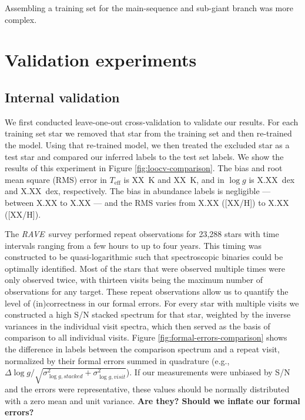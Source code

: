 \documentclass[preprint,trackchanges]{aastex}
\newcommand{\project}[1]{\textsl{#1}}
\newcommand{\rave}{\project{\acronym{RAVE}}}
\newcommand{\acronym}[1]{{\small{#1}}}
\newcommand{\stub}[1]{\textbf{#1}}
\newcommand{\teff}{T_{\mathrm{eff}}}
\newcommand{\logg}{\log g}
\begin{document}
Assembling a training set for the main-sequence and sub-giant branch was more complex.






\section{Validation experiments}
\label{sec:validation}


\subsection{Internal validation}
We first conducted leave-one-out cross-validation to validate our results.
For each training set star we removed that star from the training set and
then re-trained the model.  Using that re-trained model, we then treated
the excluded star as a test star and compared our inferred labels to the
test set labels.  We show the results of this experiment in Figure
\ref{fig:loocv-comparison}.  The bias and root mean square (RMS) error in 
$\teff$ is XX~K and XX~K, and in $\logg$ is X.XX~dex and X.XX~dex,
respectively.  The bias in abundance labels is negligible --- between
X.XX to X.XX --- and the RMS varies from X.XX ([XX/H]) to X.XX ([XX/H]).


The \rave\ survey performed repeat observations for 23,288 stars  with time 
intervals ranging from a few hours to up to four years.  This timing was 
constructed to be quasi-logarithmic such that spectroscopic binaries could
be optimally identified. Most of the stars that were observed multiple times
were only observed twice, with thirteen visits being the maximum number 
of observations for any target.  These repeat observations allow us to 
quantify the level of (in)correctness in our formal errors.  For every star
with multiple visits we constructed a high S/N stacked spectrum for that
star, weighted by the inverse variances in the individual visit spectra,
which then served as the basis of comparison to all individual visits.  
Figure \ref{fig:formal-errors-comparison} shows the difference in labels 
between the comparison spectrum and a repeat visit, normalized by their 
formal errors summed in quadrature (e.g., $\Delta\logg/\sqrt{\sigma_{\logg,stacked}^2 + \sigma_{\logg,visit}^2}$).
If our measurements were unbiased by S/N and the errors were representative, 
these values should be normally distributed with a zero mean and unit variance.
\stub{Are they? Should we inflate our formal errors?}
\end{document}
